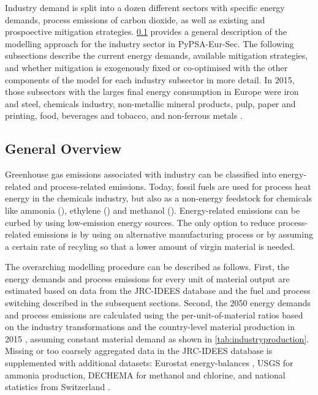 

Industry demand is split into a dozen different sectors with specific energy
demands, process emissions of carbon dioxide, as well as existing and
prospoective mitigation strategies. \cref{sec:si:industry:overview} provides a
general description of the modelling approach for the industry sector in
PyPSA-Eur-Sec. The following subsections describe the current energy demands,
available mitigation strategies, and whether mitigation is exogenously fixed or
co-optimised with the other components of the model for each industry subsector
in more detail. In 2015, those subsectors with the larges final energy
consumption in Europe were iron and steel, chemicals industry, non-metallic
mineral products, pulp, paper and printing, food, beverages and tobacco, and
non-ferrous metals \cite{IDEES}.

\subsection{General Overview}
\label{sec:si:industry:overview}

Greenhouse gas emissions associated with industry can be classified into
energy-related and process-related emissions. Today, fossil fuels are used for
process heat energy in the chemicals industry, but also as a non-energy
feedstock for chemicals like ammonia (), ethylene () and
methanol (). Energy-related emissions can be curbed by using
low-emission energy sources. The only option to reduce process-related emissions
is by using an alternative manufacturing process or by assuming a certain rate
of recyling so that a lower amount of virgin material is needed.

The overarching modelling procedure can be described as follows. First, the
energy demands and process emissions for every unit of material output are
estimated based on data from the JRC-IDEES database  and the fuel
and process switching described in the subsequent sections. Second, the 2050
energy demands and process emissions are calculated using the
per-unit-of-material ratios based on the industry transformations and the
country-level material production in 2015 , assuming constant
material demand as shown in \cref{tab:industryproduction}. Missing or too
coarsely aggregated data in the JRC-IDEES database  is supplemented
with additional datasets: Eurostat energy-balances \citeS{}, USGS 
for ammonia production, DECHEMA  for methanol
and chlorine, and national statistics from Switzerland \citeS{}.


